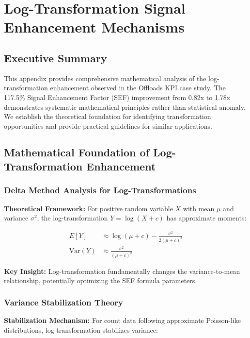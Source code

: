 \section{Log-Transformation Signal Enhancement Mechanisms}

\subsection{Executive Summary}

This appendix provides comprehensive mathematical analysis of the log-transformation enhancement observed in the Offloads KPI case study. The 117.5\% Signal Enhancement Factor (SEF) improvement from 0.82x to 1.78x demonstrates systematic mathematical principles rather than statistical anomaly. We establish the theoretical foundation for identifying transformation opportunities and provide practical guidelines for similar applications.

\subsection{Mathematical Foundation of Log-Transformation Enhancement}

\subsubsection{Delta Method Analysis for Log-Transformations}

\textbf{Theoretical Framework:} For positive random variable $X$ with mean $\mu$ and variance $\sigma^2$, the log-transformation $Y = \log(X + c)$ has approximate moments:

\begin{align}
E[Y] &\approx \log(\mu + c) - \frac{\sigma^2}{2(\mu + c)^2} \\
\text{Var}(Y) &\approx \frac{\sigma^2}{(\mu + c)^2}
\end{align}

\textbf{Key Insight:} Log-transformation fundamentally changes the variance-to-mean relationship, potentially optimizing the SEF formula parameters.

\subsubsection{Variance Stabilization Theory}

\textbf{Stabilization Mechanism:} For count data following approximate Poisson-like distributions, log-transformation stabilizes variance:

